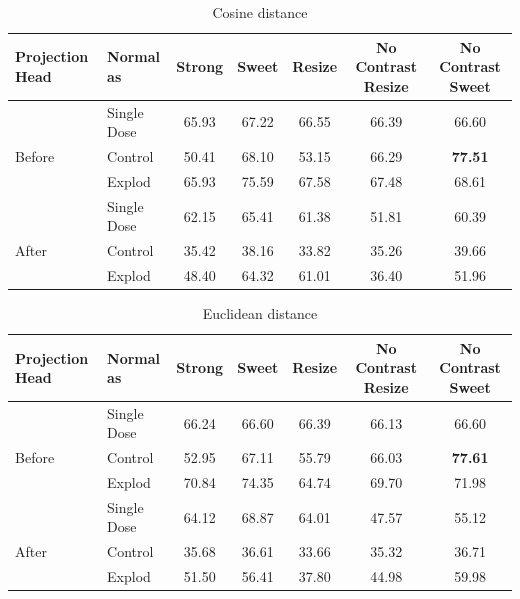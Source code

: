 \begin{table}[H]
  \centering
  \begin{tabular}{@{}llccccc@{}}
  \toprule
  Projection Head & Normal as       & Strong & Sweet & Resize & No Contrast Resize & No Contrast Sweet \\ \midrule
                  & Single Dose    & 65.93      & 67.22     & 66.55      & 66.39                  & 66.60                 \\
  Before          & Control        & 50.41      & 68.10     & 53.15      & 66.29                  & \textbf{77.51}                 \\
                  & Explod         & 65.93      & 75.59     & 67.58      & 67.48                  & 68.61                 \\ \midrule
                  & Single Dose    & 62.15      & 65.41     & 61.38      & 51.81                  & 60.39                 \\
  After           & Control        & 35.42      & 38.16    & 33.82      & 35.26                  & 39.66                 \\
                  & Explod         & 48.40      & 64.32     & 61.01      & 36.40                  & 51.96                 \\ \bottomrule
  \end{tabular}
  \caption{Cosine distance}
  \label{tab:table_label}
\end{table}

\begin{table}[H]
  \centering
  \begin{tabular}{@{}llccccc@{}}
  \toprule
  Projection Head & Normal as       & Strong & Sweet & Resize & No Contrast Resize & No Contrast Sweet \\ \midrule
                  & Single Dose    & 66.24      & 66.60     & 66.39      & 66.13                  & 66.60                 \\
  Before          & Control        & 52.95      & 67.11     & 55.79      & 66.03                  & \textbf{77.61}                 \\
                  & Explod         & 70.84      & 74.35     & 64.74      & 69.70                  & 71.98                 \\ \midrule
                  & Single Dose    & 64.12      & 68.87     & 64.01      & 47.57                  & 55.12                 \\
  After           & Control        & 35.68      & 36.61     & 33.66      & 35.32                  & 36.71                 \\
                  & Explod         & 51.50      & 56.41     & 37.80      & 44.98                  & 59.98                 \\ \bottomrule
  \end{tabular}
  \caption{Euclidean distance}
  \label{tab:table_label}
\end{table}

